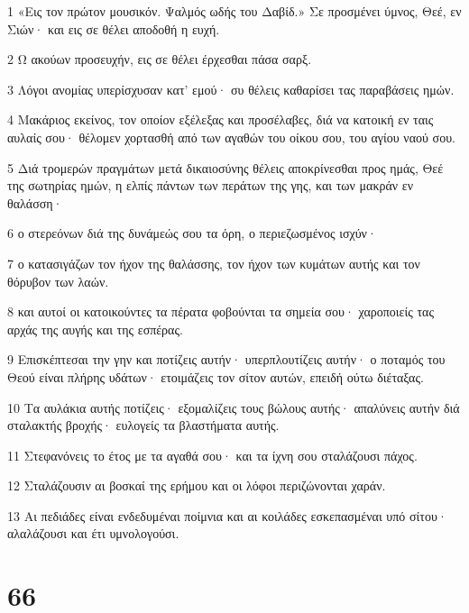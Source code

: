 \par 1 «Εις τον πρώτον μουσικόν. Ψαλμός ωδής του Δαβίδ.» Σε προσμένει ύμνος, Θεέ, εν Σιών· και εις σε θέλει αποδοθή η ευχή.
\par 2 Ω ακούων προσευχήν, εις σε θέλει έρχεσθαι πάσα σαρξ.
\par 3 Λόγοι ανομίας υπερίσχυσαν κατ' εμού· συ θέλεις καθαρίσει τας παραβάσεις ημών.
\par 4 Μακάριος εκείνος, τον οποίον εξέλεξας και προσέλαβες, διά να κατοική εν ταις αυλαίς σου· θέλομεν χορτασθή από των αγαθών του οίκου σου, του αγίου ναού σου.
\par 5 Διά τρομερών πραγμάτων μετά δικαιοσύνης θέλεις αποκρίνεσθαι προς ημάς, Θεέ της σωτηρίας ημών, η ελπίς πάντων των περάτων της γης, και των μακράν εν θαλάσση·
\par 6 ο στερεόνων διά της δυνάμεώς σου τα όρη, ο περιεζωσμένος ισχύν·
\par 7 ο κατασιγάζων τον ήχον της θαλάσσης, τον ήχον των κυμάτων αυτής και τον θόρυβον των λαών.
\par 8 και αυτοί οι κατοικούντες τα πέρατα φοβούνται τα σημεία σου· χαροποιείς τας αρχάς της αυγής και της εσπέρας.
\par 9 Επισκέπτεσαι την γην και ποτίζεις αυτήν· υπερπλουτίζεις αυτήν· ο ποταμός του Θεού είναι πλήρης υδάτων· ετοιμάζεις τον σίτον αυτών, επειδή ούτω διέταξας.
\par 10 Τα αυλάκια αυτής ποτίζεις· εξομαλίζεις τους βώλους αυτής· απαλύνεις αυτήν διά σταλακτής βροχής· ευλογείς τα βλαστήματα αυτής.
\par 11 Στεφανόνεις το έτος με τα αγαθά σου· και τα ίχνη σου σταλάζουσι πάχος.
\par 12 Σταλάζουσιν αι βοσκαί της ερήμου και οι λόφοι περιζώνονται χαράν.
\par 13 Αι πεδιάδες είναι ενδεδυμέναι ποίμνια και αι κοιλάδες εσκεπασμέναι υπό σίτου· αλαλάζουσι και έτι υμνολογούσι.

\chapter{66}

